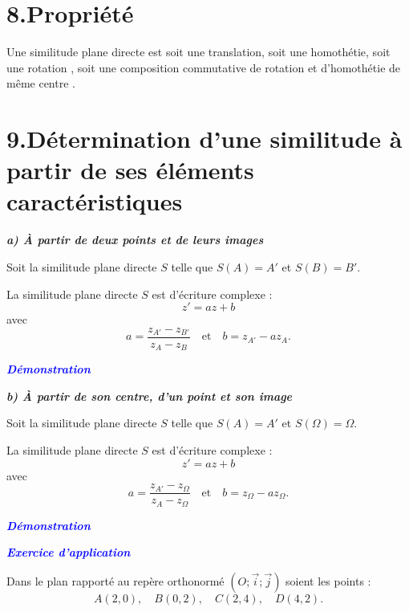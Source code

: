 \documentclass{article}
\begin{document}
\section*{8.Propriété}

Une similitude plane directe est soit une translation, soit une homothétie, soit une rotation , soit une
composition commutative de rotation et d’homothétie de même centre .

\section*{9.Détermination d’une similitude à partir de ses éléments caractéristiques}

\vspace{0.3cm}

\textbf{\textit{a) À partir de deux points et de leurs images}}

\vspace{0.3cm}

Soit la similitude plane directe \( S \) telle que \quad \( S(A) = A' \) \quad et \quad \( S(B) = B' \).

\vspace{0.3cm}

La similitude plane directe \( S \) est d’écriture complexe :
\[
z' = a z + b
\]
avec 
\[
a = \frac{z_{A'} - z_{B'}}{z_A - z_B} \quad \text{et} \quad b = z_{A'} - a z_A.
\]

\textbf{\textcolor{blue}{\textit{Démonstration}}}

\textbf{\textit{b) À partir de son centre, d’un point et son image}}

\vspace{0.3cm}

Soit la similitude plane directe \( S \) telle que \quad \( S(A) = A' \) \quad et \quad \( S(\Omega) = \Omega \).

\vspace{0.3cm}

La similitude plane directe \( S \) est d’écriture complexe :
\[
z' = a z + b
\]
avec 
\[
a = \frac{z_{A'} - z_{\Omega}}{z_A - z_{\Omega}} \quad \text{et} \quad b = z_{\Omega} - a z_{\Omega}.
\]

\textbf{\textcolor{blue}{\textit{Démonstration}}}

\textbf{\textcolor{blue}{\textit{Exercice d’application}}}

Dans le plan rapporté au repère orthonormé \( (O; \vec{i}; \vec{j}) \) soient les points : 
\[
A(2,0), \quad B(0,2), \quad C(2,4), \quad D(4,2).
\]
\end{document}
